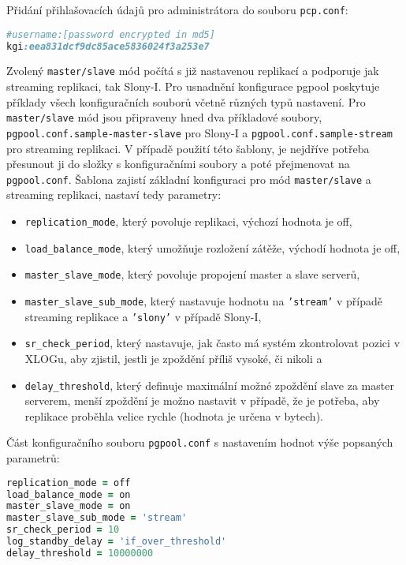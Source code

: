 Přidání přihlašovacích údajů pro administrátora do souboru \texttt{pcp.conf}:
\begin{lstlisting}[language=ruby]
#username:[password encrypted in md5]
kgi:eea831dcf9dc85ace5836024f3a253e7
\end{lstlisting}

Zvolený \texttt{master/slave} mód počítá s již nastavenou replikací a podporuje jak streaming replikaci, tak Slony-I. Pro usnadnění konfigurace pgpool poskytuje příklady všech konfiguračních souborů včetně různých typů nastavení. Pro \texttt{master/slave} mód jsou připraveny hned dva příkladové soubory, \texttt{pgpool.conf.sample-master-slave} pro Slony-I a \texttt{pgpool.conf.sample-stream} pro streaming replikaci. V případě použití této šablony, je nejdříve potřeba přesunout ji do složky s konfiguračními soubory a poté přejmenovat na \texttt{pgpool.conf}. Šablona zajistí základní konfiguraci pro mód \texttt{master/slave} a streaming replikaci, nastaví tedy parametry:
\begin{itemize}
\item \texttt{replication\_mode}, který povoluje replikaci, výchozí hodnota je off, 
\item \texttt{load\_balance\_mode}, který umožňuje rozložení zátěže, východí hodnota je off,
\item \texttt{master\_slave\_mode}, který povoluje propojení master a slave serverů, 
\item \texttt{master\_slave\_sub\_mode}, který nastavuje hodnotu na \texttt{'stream’} v případě streaming replikace a \texttt{'slony'} v případě Slony-I, 
\item \texttt{sr\_check\_period}, který nastavuje, jak často má systém zkontrolovat pozici v XLOGu, aby zjistil, jestli je zpoždění příliš vysoké, či nikoli a 
\item \texttt{delay\_threshold}, který definuje maximální možné zpoždění slave za master serverem, menší zpoždění je možno nastavit v případě, že je potřeba, aby replikace proběhla velice rychle (hodnota je určena v bytech). 
\end{itemize}

Část konfiguračního souboru \texttt{pgpool.conf} s nastavením hodnot výše popsaných parametrů:
\begin{lstlisting}[language=ruby]
replication_mode = off	
load_balance_mode = on	
master_slave_mode = on	
master_slave_sub_mode = 'stream'
sr_check_period = 10
log_standby_delay = 'if_over_threshold'
delay_threshold = 10000000 
\end{lstlisting}

